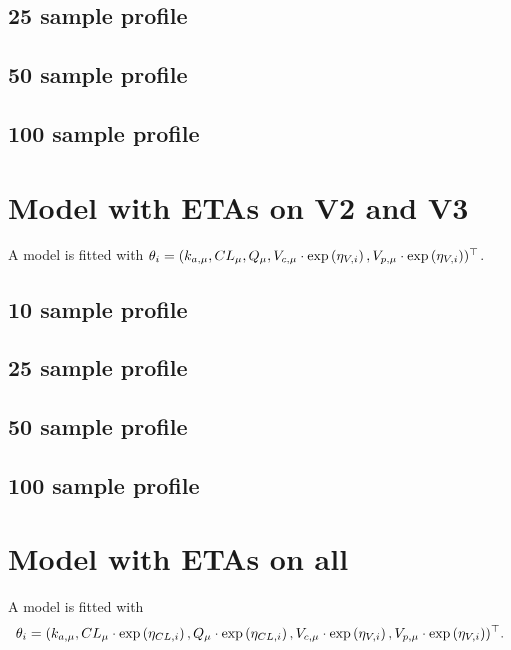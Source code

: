 \subsection{25 sample profile}

\subsection{50 sample profile}

\subsection{100 sample profile}


\section{Model with ETAs on V2 and V3}
A model is fitted with $\theta_i = (k_{a,\mu}, CL_{\mu}, Q_{\mu},V_{c,\mu}\cdot \text{exp}\left({\eta_{V,i}}\right),V_{p,\mu}\cdot \text{exp}\left({\eta_{V,i}}\right))^\top$.

\subsection{10 sample profile}

\subsection{25 sample profile}

\subsection{50 sample profile}

\subsection{100 sample profile}


\section{Model with ETAs on all}
A model is fitted with $$\theta_i = (k_{a,\mu}, CL_{\mu}\cdot \text{exp}\left({\eta_{CL,i}}\right), Q_{\mu}\cdot \text{exp}\left({\eta_{CL,i}}\right),V_{c,\mu}\cdot \text{exp}\left({\eta_{V,i}}\right),V_{p,\mu}\cdot \text{exp}\left({\eta_{V,i}}\right))^\top.$$

